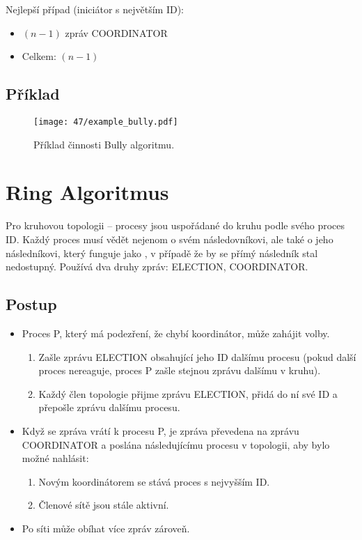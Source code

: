 \noindent Nejlepší případ (iniciátor s největším ID):

\begin{itemize}
    \item $(n-1)$ zpráv COORDINATOR
    \item Celkem: $(n-1)$
\end{itemize}

\subsection*{Příklad}

\begin{figure}[H]
    \centering
    \texttt{[image: 47/example\_bully.pdf]}
    \caption{Příklad činnosti Bully algoritmu.}
\end{figure}


\section{Ring Algoritmus}

Pro kruhovou topologii -- procesy jsou uspořádané do kruhu podle svého proces ID.
Každý proces musí vědět nejenom o svém následovníkovi, ale také o jeho následníkovi, který funguje jako , v případě že by se přímý následník stal nedostupný. Používá dva druhy zpráv: ELECTION, COORDINATOR.

\subsection*{Postup}

\begin{itemize}
    \item Proces P, který má podezření, že chybí koordinátor, může zahájit volby.
    \begin{enumerate}
        \item Zašle zprávu ELECTION obsahující jeho ID dalšímu procesu (pokud další proces nereaguje, proces P zašle stejnou zprávu dalšímu v kruhu).
        \item Každý člen topologie přijme zprávu ELECTION, přidá do ní své ID a přepošle zprávu dalšímu procesu.
    \end{enumerate}
    \item Když se zpráva vrátí k procesu P, je zpráva převedena na zprávu  COORDINATOR a poslána následujícímu procesu v topologii, aby bylo možné nahlásit:
    \begin{enumerate}
        \item Novým koordinátorem se stává proces s nejvyšším ID.
        \item Členové sítě jsou stále aktivní.
    \end{enumerate}
    \item Po síti může obíhat více zpráv zároveň.
\end{itemize}

